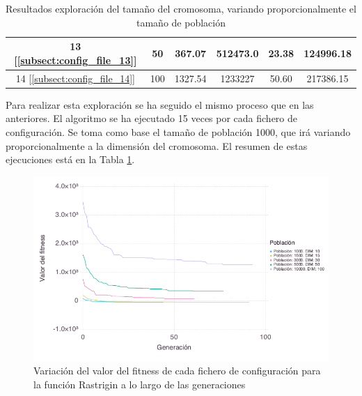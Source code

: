 \begin{table}[]
\begin{tabular}{|c|c|c|c|c|c|}
        13  [\ref{subsect:config_file_13}]               & 50           & 367.07                                                                                & 512473.0                                                                           & 23.38                                                                         & 124996.18                                                                   \\ \hline
        14  [\ref{subsect:config_file_14}]               & 100          & 1327.54                                                                               & 1233227                                                                            & 50.60                                                                         & 217386.15                                                                   \\ \hline
    \end{tabular}
    \caption{Resultados exploración del tamaño del cromosoma, variando proporcionalmente el tamaño de población}
    \label{tab:exploracion_dim_cromosoma}
\end{table}

Para realizar esta exploración se ha seguido el mismo proceso que en las anteriores. El algoritmo se ha ejecutado 15 veces por cada fichero de configuración.
Se toma como base el tamaño de población 1000, que irá variando proporcionalmente a la dimensión del cromosoma. El resumen de estas ejecuciones está en la 
Tabla \ref{tab:exploracion_dim_cromosoma}. 

\begin{figure}[]
	\centering	
	\includegraphics[scale=0.5]{../data/Plots/ps_cd_variation.png}
	\caption{ Variación del valor del fitness de cada fichero de configuración para la función Rastrigin a lo largo de las generaciones }
    \label{fig:exec_summary}
\end{figure}

